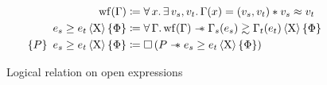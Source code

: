 \begin{figure}[tp]
    \begin{align*}
    		\wf{\datalangBisubst}
    		&\coloneqq
    		\forall \datalangVar \ldotp
    		\exists \datalangVal_s, \datalangVal_t \ldotp
    		\datalangBisubst (\datalangVar) = (\datalangVal_s, \datalangVal_t) \iSep
    		\datalangVal_s \iSimilar \datalangVal_t
    	\\
    		\iRsimv[\iProt]{\iPred}{\datalangExpr_s}{\datalangExpr_t}
    		&\coloneqq
    		\forall \datalangBisubst \ldotp
    		\wf{\datalangBisubst} \iWand
    		\iSimv[\iProt]{\iPred}{\datalangBisubst_s (\datalangExpr_s)}{\datalangBisubst_t (\datalangExpr_t)}
    	\\
    	   \iRsimvHoare[\iProt]{P}{\iPred}{\datalangExpr_s}{\datalangExpr_t}
    	   &\coloneqq
    	   \iPersistent \left( P \iWand \iRsimv[\iProt]{\iPred}{\datalangExpr_s}{\datalangExpr_t} \right)
    \end{align*}
    \caption{Logical relation on open expressions}
    \label{fig:rsim}
\end{figure}